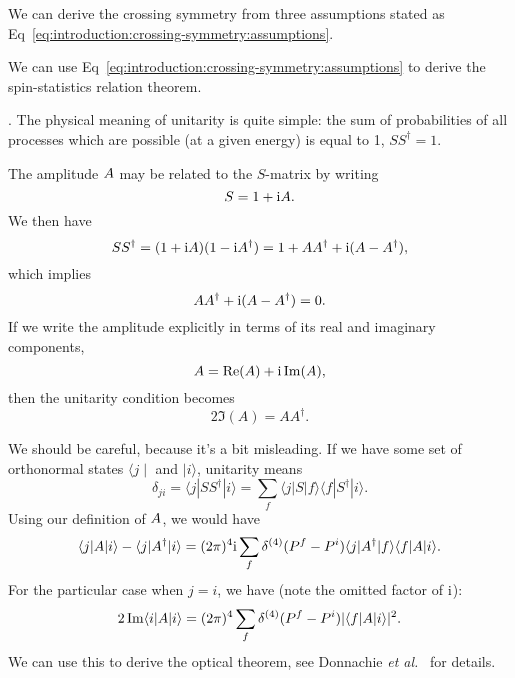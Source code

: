We can derive the crossing symmetry from three assumptions stated as Eq~\eqref{eq:introduction:crossing-symmetry:assumptions}.

We can use Eq~\eqref{eq:introduction:crossing-symmetry:assumptions}
to derive the spin-statistics relation theorem.

. The physical
meaning of unitarity is quite simple: the sum of probabilities of all
processes which are possible (at a given energy) is equal to 1,
$SS^{\dagger}=1$.

The amplitude $A$ may be related to the $S$-matrix by writing
\begin{equation}
S = 1 + \mathrm{i} A.
\end{equation}
We then have
\begin{equation}
SS^{\dagger} = (1 + \mathrm{i} A)(1 - \mathrm{i} A^{\dagger}) = 1 + AA^{\dagger} + \mathrm{i}(A-A^{\dagger}),
\end{equation}
which implies
\begin{equation}
AA^{\dagger} + \mathrm{i}(A-A^{\dagger})=0.
\end{equation}
If we write the amplitude explicitly in terms of its real and imaginary components,
\begin{equation}
A = \operatorname{Re}(A) + \mathrm{i}\operatorname{Im}(A),
\end{equation}
then the unitarity condition becomes
\begin{equation}\label{eq:unitarity:in-terms-of-amplitude}
2\Im(A) = AA^{\dagger}.
\end{equation}

\M
We should be careful, because it's a bit misleading. If we have some set
of orthonormal states $\langle j\mid$ and $\mid i\rangle$, unitarity
means
\begin{equation}
  \delta_{ji} = \langle j| SS^{\dagger}| i\rangle
  =\sum_{f}\langle j| S| f\rangle\langle f| S^{\dagger}| i\rangle.
\end{equation}
Using our definition of $A$, we would have
\begin{equation}
\langle j|A|i\rangle - \langle j|A^{\dagger}|i\rangle
=(2\pi)^{4}\mathrm{i}\sum_{f}\delta^{(4)}(P^{f}-P^{i})
\langle j|A^{\dagger}|f\rangle\langle f|A|i\rangle.
\end{equation}
For the particular case when $j=i$, we have (note the omitted factor of $\mathrm{i}$):
\begin{equation}
2\operatorname{Im}\langle i|A|i\rangle
=(2\pi)^{4}\sum_{f}\delta^{(4)}(P^{f}-P^{i}) |\langle f|A|i\rangle|^{2}.
\end{equation}
We can use this to derive the optical theorem, see Donnachie \textit{et al.}~\cite[esp.~\S\S1.2--1.3]{Donnachie:2002en}
for details.

